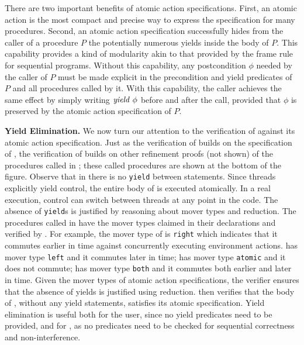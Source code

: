 There are two important benefits of atomic action specifications.
First, an atomic action is the most compact and precise way to express the specification for many procedures.
Second, an atomic action specification successfully hides from the caller of a procedure $P$
the potentially numerous yields inside the body of $P$.
This capability provides a kind of modularity akin to that provided by the frame rule for sequential programs.
Without this capability, any postcondition $\phi$ needed by the caller of $P$ must be made explicit in the precondition 
and yield predicates of $P$ and all procedures called by it.
With this capability, the caller achieves the same effect by simply writing $\mathit{yield}\ \phi$ before and after the call, 
provided that $\phi$ is preserved by the atomic action specification of $P$.


{\bf Yield Elimination.} 
We now turn our attention to the verification of  against
its atomic action specification.
Just as the verification of  builds on the specification of ,
the verification of  builds on other refinement proofs (not shown) 
of the procedures called in ;
these called procedures are shown at the bottom of the figure. 
Observe that in  there is no {\tt yield} between
statements. Since threads explicitly yield control, the
entire body of  is executed atomically. In
a real execution, control can switch between threads at any point in
the code. The absence of {\tt yield}s is justified by reasoning about
mover types and reduction. The procedures called in
 have the mover types claimed in their
declarations and verified by \civl. 
For example, the mover type of  is {\tt right} which indicates 
that it commutes earlier in time against concurrently executing environment actions.
 has mover type {\tt left} and it commutes later in time;
 has mover type {\tt atomic} and it does not commute;
 has mover type {\tt both} and it commutes both earlier and later in time.
Given the mover types of 
atomic action specifications, the \civl verifier ensures
that the absence of yields is justified using reduction.  
\civl then verifies that the body of , without any yield statements, satisfies
its atomic specification. Yield elimination is useful both for the
user, since no yield predicates need to be provided, and for \civl,
as no predicates need to be checked for sequential correctness and
non-interference.

